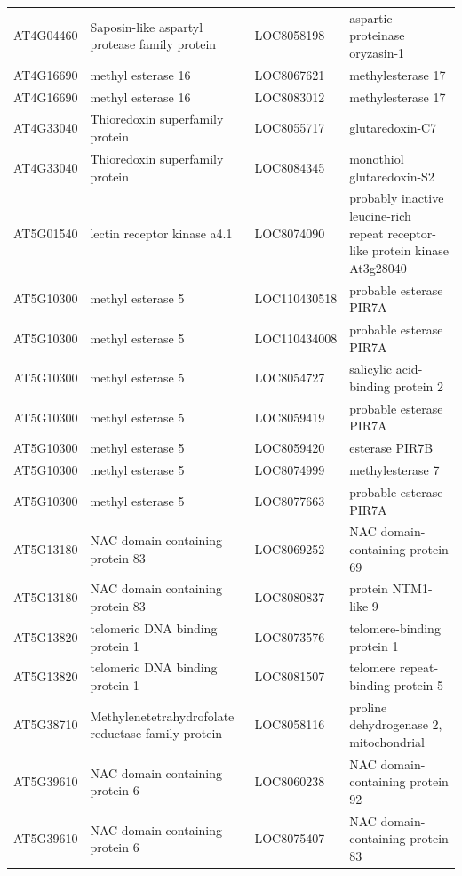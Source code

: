 \begin{longtable}{l p{5.5cm} l p{4.5cm}}
        AT4G04460 & Saposin-like aspartyl protease family protein & LOC8058198 & aspartic proteinase oryzasin-1 \\
        AT4G16690 & methyl esterase 16 & LOC8067621 & methylesterase 17 \\
        AT4G16690 & methyl esterase 16 & LOC8083012 & methylesterase 17 \\
        AT4G33040 & Thioredoxin superfamily protein & LOC8055717 & glutaredoxin-C7 \\
        AT4G33040 & Thioredoxin superfamily protein & LOC8084345 & monothiol glutaredoxin-S2 \\
        AT5G01540 & lectin receptor kinase a4.1 & LOC8074090 & probably inactive leucine-rich repeat receptor-like protein kinase At3g28040 \\
        AT5G10300 & methyl esterase 5 & LOC110430518 & probable esterase PIR7A \\
        AT5G10300 & methyl esterase 5 & LOC110434008 & probable esterase PIR7A \\
        AT5G10300 & methyl esterase 5 & LOC8054727 & salicylic acid-binding protein 2 \\
        AT5G10300 & methyl esterase 5 & LOC8059419 & probable esterase PIR7A \\
        AT5G10300 & methyl esterase 5 & LOC8059420 & esterase PIR7B \\
        AT5G10300 & methyl esterase 5 & LOC8074999 & methylesterase 7 \\
        AT5G10300 & methyl esterase 5 & LOC8077663 & probable esterase PIR7A \\
        AT5G13180 & NAC domain containing protein 83 & LOC8069252 & NAC domain-containing protein 69 \\
        AT5G13180 & NAC domain containing protein 83 & LOC8080837 & protein NTM1-like 9 \\
        AT5G13820 & telomeric DNA binding protein 1 & LOC8073576 & telomere-binding protein 1 \\
        AT5G13820 & telomeric DNA binding protein 1 & LOC8081507 & telomere repeat-binding protein 5 \\
        AT5G38710 & Methylenetetrahydrofolate reductase family protein & LOC8058116 & proline dehydrogenase 2, mitochondrial \\
        AT5G39610 & NAC domain containing protein 6 & LOC8060238 & NAC domain-containing protein 92 \\
        AT5G39610 & NAC domain containing protein 6 & LOC8075407 & NAC domain-containing protein 83 \\

\end{longtable}
